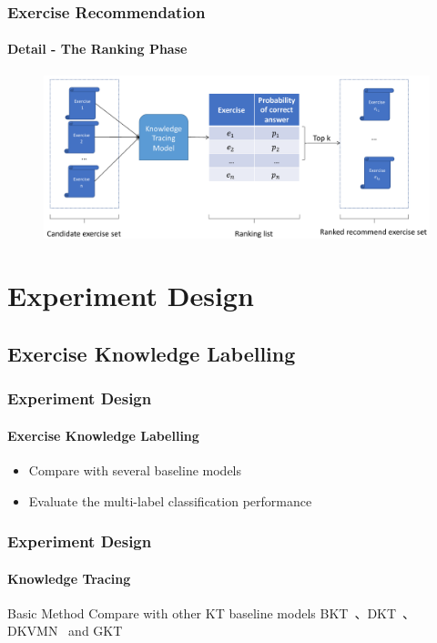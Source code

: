 \documentclass{beamer}
\begin{document}
\begin{frame}
  \frametitle{Exercise Recommendation}
  \framesubtitle{Detail - The Ranking Phase}
  \begin{figure}
    \centering
    \includegraphics[width=1.0\textwidth]{figures/ch4-ranking-model.pdf}
  \end{figure}
\end{frame}

\section{Experiment Design}
\subsection{Exercise Knowledge Labelling}
\begin{frame}
  \frametitle{Experiment Design}
  \framesubtitle{Exercise Knowledge Labelling}
  \begin{itemize}
    \item Compare with several baseline models
    \item Evaluate the multi-label classification performance
  \end{itemize}
\end{frame}

\begin{frame}
  \frametitle{Experiment Design}
  \framesubtitle{Knowledge Tracing}
  \begin{block}{Basic Method}
    Compare with other KT baseline models BKT~\cite{yudelson2013individualized}、DKT~\cite{piech2015deep}、DKVMN~\cite{chen2017improving} and GKT~\cite{nakagawa2019graph}
  \end{block}
  \begin{table}[htbp!]
    \centering
    \caption{Dataset Statistics}\label{tbl:ch2-tb1}
  \end{table}
\end{frame}
\end{document}

